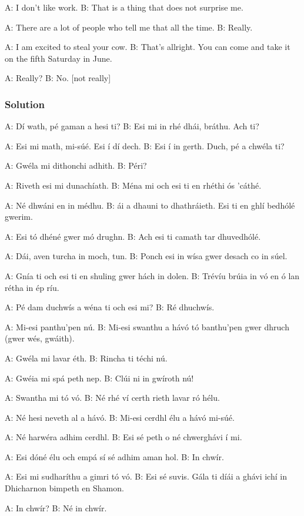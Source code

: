 A: I don't like work.
B: That is a thing that does not surprise me.

A: There are a lot of people who tell me that all the time.
B: Really.

A: I am excited to steal your cow.
B: That's allright. You can come and take it on the fifth Saturday in June.

A: Really?
B: No. [not really]

\newpage
\subsubsection{Solution}

A: D\'{i} wath, p\'{e} gaman a hesi ti?
B: Esi mi in rh\'{e} dh\'{a}i, br\'{a}thu. Ach ti?

A: Esi mi math, mi-s\'{u}\'{e}. Esi \'{i} d\'{i} dech.
B: Esi \'{i} in gerth. Duch, p\'{e} a chw\'{e}la ti?

A: Gw\'{e}la mi dithonchi adhith.
B: P\'{e}ri?

A: Riveth esi mi dunach\'{i}ath.
B: M\'{e}na mi och esi ti en rh\'{e}thi \'{o}s 'c\'{a}th\'{e}.

A: N\'{e} dhw\'{a}ni en in m\'{e}dhu.
B: \'{a}i a dhauni to dhathr\'{a}ieth. Esi ti en ghl\'{i} bedh\'{o}l\'{e} gwerim.

A: Esi t\'{o} dh\'{e}n\'{e} gwer m\'{o} drughn.
B: Ach esi ti camath tar dhuvedh\'{o}l\'{e}.

A: D\'{a}i, aven turcha in moch, tun.
B: Ponch esi in w\'{i}sa gwer desach co in s\'{u}el.

A: Gn\'{i}a ti och esi ti en shuling gwer h\'{a}ch in dolen.
B: Tr\'{e}v\'{i}u br\'{u}ia in v\'{o} en \'{o} lan r\'{e}tha in \'{e}p r\'{i}u.

A: P\'{e} dam duchw\'{i}s a w\'{e}na ti och esi mi?
B: R\'{e} dhuchw\'{i}s.

A: Mi-esi panthu'pen n\'{u}.
B: Mi-esi swanthu a h\'{a}v\'{o} t\'{o} banthu'pen gwer dhruch (gwer w\'{e}s, gw\'{a}ith).

A: Gw\'{e}la mi lavar \'{e}th.
B: Rincha ti t\'{e}chi n\'{u}.

A: Gw\'{e}ia mi sp\'{a} peth nep.
B: Cl\'{u}i ni in gw\'{i}roth n\'{u}!

A: Swantha mi t\'{o} v\'{o}.
B: N\'{e} rh\'{e} v\'{i} certh rieth lavar r\'{o} h\'{e}lu.

A: N\'{e} hesi neveth al a h\'{a}v\'{o}.
B: Mi-esi cerdhl \'{e}lu a h\'{a}v\'{o} mi-s\'{u}\'{e}.

A: N\'{e} harw\'{e}ra adhim cerdhl.
B: Esi s\'{e} peth o n\'{e} chwergh\'{a}vi \'{i} mi.

A: Esi d\'{o}n\'{e} \'{e}lu och emp\'{a} s\'{i} s\'{e} adhim aman hol.
B: In chw\'{i}r.

A: Esi mi sudhar\'{i}thu a gimri t\'{o} v\'{o}.
B: Esi s\'{e} suvis. G\'{a}la ti d\'{i}\'{a}i a gh\'{a}vi ich\'{i} in Dhicharnon bimpeth en Shamon.

A: In chw\'{i}r?
B: N\'{e} in chw\'{i}r.
